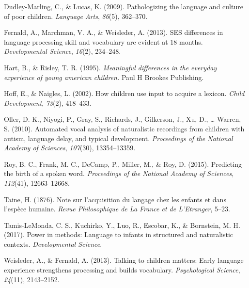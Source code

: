 \documentclass[man]{apa6}
\theoremstyle{definition}
\theoremstyle{definition}
\theoremstyle{definition}
\theoremstyle{remark}
\begin{document}
\hypertarget{ref-dudley2009pathologizing}{}
Dudley-Marling, C., \& Lucas, K. (2009). Pathologizing the language and
culture of poor children. \emph{Language Arts}, \emph{86}(5), 362--370.

\hypertarget{ref-fernald2013ses}{}
Fernald, A., Marchman, V. A., \& Weisleder, A. (2013). SES differences
in language processing skill and vocabulary are evident at 18 months.
\emph{Developmental Science}, \emph{16}(2), 234--248.

\hypertarget{ref-hart1995meaningful}{}
Hart, B., \& Risley, T. R. (1995). \emph{Meaningful differences in the
everyday experience of young american children.} Paul H Brookes
Publishing.

\hypertarget{ref-hoff2002children}{}
Hoff, E., \& Naigles, L. (2002). How children use input to acquire a
lexicon. \emph{Child Development}, \emph{73}(2), 418--433.

\hypertarget{ref-oller2010automated}{}
Oller, D. K., Niyogi, P., Gray, S., Richards, J., Gilkerson, J., Xu, D.,
\ldots{} Warren, S. (2010). Automated vocal analysis of naturalistic
recordings from children with autism, language delay, and typical
development. \emph{Proceedings of the National Academy of Sciences},
\emph{107}(30), 13354--13359.

\hypertarget{ref-roy2015predicting}{}
Roy, B. C., Frank, M. C., DeCamp, P., Miller, M., \& Roy, D. (2015).
Predicting the birth of a spoken word. \emph{Proceedings of the National
Academy of Sciences}, \emph{112}(41), 12663--12668.

\hypertarget{ref-taine1876note}{}
Taine, H. (1876). Note sur l'acquisition du langage chez les enfants et
dans l'espèce humaine. \emph{Revue Philosophique de La France et de
L'Etranger}, 5--23.

\hypertarget{ref-tamis2017power}{}
Tamis-LeMonda, C. S., Kuchirko, Y., Luo, R., Escobar, K., \& Bornstein,
M. H. (2017). Power in methods: Language to infants in structured and
naturalistic contexts. \emph{Developmental Science}.

\hypertarget{ref-weisleder2013talking}{}
Weisleder, A., \& Fernald, A. (2013). Talking to children matters: Early
language experience strengthens processing and builds vocabulary.
\emph{Psychological Science}, \emph{24}(11), 2143--2152.
\end{document}
